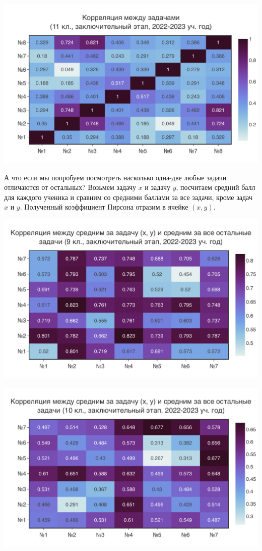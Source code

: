 \includegraphics[width=\linewidth]{../export/pdf/results/2023/respa/grade11.pdf}

\newpage 

А что если мы попробуем посмотреть насколько одна-две любые задачи отличаются от остальных? Возьмем задачу $x$ и задачу $y$, посчитаем средний балл для каждого ученика и сравним со средними баллами за все задачи, кроме задач $x$ и $y$. Полученный коэффициент Пирсона отразим в ячейке $(x,y)$.

\includegraphics[width=\linewidth]{../export/pdf/results/2023/respa/grade9-avg.pdf}

\includegraphics[width=\linewidth]{../export/pdf/results/2023/respa/grade10-avg.pdf}

